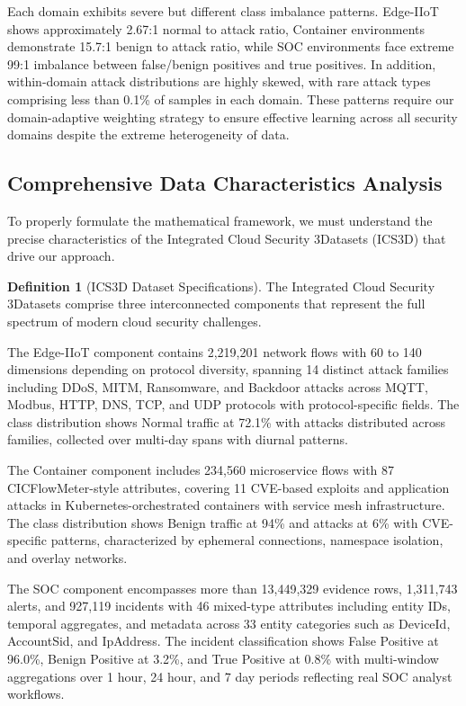\documentclass[12pt,a4paper]{article}
\theoremstyle{definition}
\newtheorem{definition}[theorem]{Definition}
\begin{document}
Each domain exhibits severe but different class imbalance patterns. Edge-IIoT shows approximately 2.67:1 normal to attack ratio, Container environments demonstrate 15.7:1 benign to attack ratio, while SOC environments face extreme 99:1 imbalance between false/benign positives and true positives. In addition, within-domain attack distributions are highly skewed, with rare attack types comprising less than 0.1\% of samples in each domain. These patterns require our domain-adaptive weighting strategy to ensure effective learning across all security domains despite the extreme heterogeneity of data.

\subsection{Comprehensive Data Characteristics Analysis}

To properly formulate the mathematical framework, we must understand the precise characteristics of the Integrated Cloud Security 3Datasets (ICS3D) that drive our approach.

\begin{definition}[ICS3D Dataset Specifications]
\label{def:ics3d_specs}
The Integrated Cloud Security 3Datasets comprise three interconnected components that represent the full spectrum of modern cloud security challenges.

The Edge-IIoT component contains 2,219,201 network flows with 60 to 140 dimensions depending on protocol diversity, spanning 14 distinct attack families including DDoS, MITM, Ransomware, and Backdoor attacks across MQTT, Modbus, HTTP, DNS, TCP, and UDP protocols with protocol-specific fields. The class distribution shows Normal traffic at 72.1\% with attacks distributed across families, collected over multi-day spans with diurnal patterns.

The Container component includes 234,560 microservice flows with 87 CICFlowMeter-style attributes, covering 11 CVE-based exploits and application attacks in Kubernetes-orchestrated containers with service mesh infrastructure. The class distribution shows Benign traffic at 94\% and attacks at 6\% with CVE-specific patterns, characterized by ephemeral connections, namespace isolation, and overlay networks.

The SOC component encompasses more than 13,449,329 evidence rows, 1,311,743 alerts, and 927,119 incidents with 46 mixed-type attributes including entity IDs, temporal aggregates, and metadata across 33 entity categories such as DeviceId, AccountSid, and IpAddress. The incident classification shows False Positive at 96.0\%, Benign Positive at 3.2\%, and True Positive at 0.8\% with multi-window aggregations over 1 hour, 24 hour, and 7 day periods reflecting real SOC analyst workflows.
\end{definition}
\end{document}
